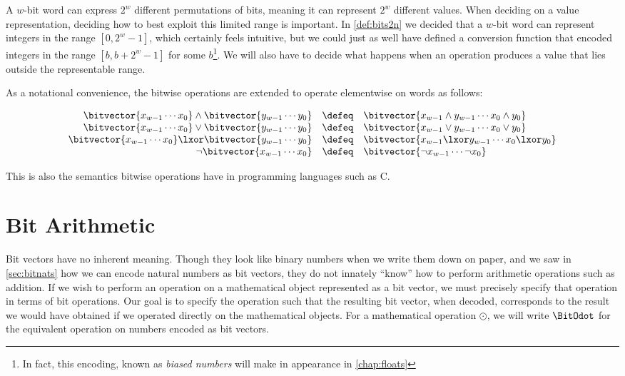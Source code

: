 A $w$-bit word can express $2^{w}$ different permutations of bits,
meaning it can represent $2^{w}$ different values.  When deciding on a
value representation, deciding how to best exploit this limited range
is important.  In \cref{def:bits2n} we decided that a $w$-bit word can
represent integers in the range $[0,2^{w}-1]$, which certainly feels
intuitive, but we could just as well have defined a conversion
function that encoded integers in the range $[b,b+2^{w}-1]$ for some
$b$\footnote{In fact, this encoding, known as \emph{biased numbers}
  will make in appearance in \cref{chap:floats}}.  We will also have
to decide what happens when an operation produces a value that lies
outside the representable range.

As a notational convenience, the bitwise operations are extended to
operate elementwise on words as follows:

\begin{definition}
  \[
    \begin{array}{rcl}
      \bitvector{x_{w-1}\cdots x_{0}} \land \bitvector{y_{w-1}\cdots y_{0}}
      &\defeq& \bitvector{x_{w-1} \land y_{w-1}\cdots x_{0} \land y_{0}} \\
      \bitvector{x_{w-1}\cdots x_{0}} \lor \bitvector{y_{w-1}\cdots y_{0}}
      &\defeq& \bitvector{x_{w-1} \lor y_{w-1} \cdots x_{0} \lor y_{0}} \\
      \bitvector{x_{w-1}\cdots x_{0}} \lxor \bitvector{y_{w-1}\cdots y_{0}}
      &\defeq& \bitvector{x_{w-1} \lxor y_{w-1}\cdots x_{0} \lxor y_{0}} \\
      \neg \bitvector{x_{w-1}\cdots x_{0}}
      &\defeq& \bitvector{\neg x_{w-1}\cdots \neg x_{0}}
    \end{array}
  \]
  \label{def:wordbitwise}
\end{definition}

This is also the semantics bitwise operations have in programming
languages such as C.

\section{Bit Arithmetic}
\label{sec:bit-arithmetic}

Bit vectors have no inherent meaning.  Though they look like binary
numbers when we write them down on paper, and we saw in
\cref{sec:bitnats} how we can encode natural numbers as bit vectors,
they do not innately ``know'' how to perform arithmetic operations
such as addition.  If we wish to perform an operation on a
mathematical object represented as a bit vector, we must precisely
specify that operation in terms of bit operations.  Our goal is to
specify the operation such that the resulting bit vector, when
decoded, corresponds to the result we would have obtained if we
operated directly on the mathematical objects.  For a mathematical
operation $\odot$, we will write $\BitOdot$ for the equivalent
operation on numbers encoded as bit vectors.

